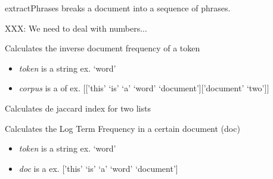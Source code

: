 \documentclass[letterpaper,10pt,english]{sphinxmanual}
\begin{document}

\begin{fulllineitems}
\label{theseus:theseus.extractPhrases}
extractPhrases breaks a document into a sequence of phrases.

XXX: We need to deal with numbers...

\end{fulllineitems}


\begin{fulllineitems}
\label{theseus:theseus.idf}
Calculates the inverse document frequency of a token
\begin{itemize}
\item {} 
\emph{token} is a string               ex. `word'

\item {} 
\emph{corpus} is a  of     ex. {[}{[}'this' `is' `a' `word' `document'{]}{[}'document' `two'{]}{]}

\end{itemize}

\end{fulllineitems}


\begin{fulllineitems}
\label{theseus:theseus.jaccard}
Calculates de jaccard index for two lists

\end{fulllineitems}


\begin{fulllineitems}
\label{theseus:theseus.logtf}
Calculates the Log Term Frequency in a certain document (doc)
\begin{itemize}
\item {} 
\emph{token} is a string   ex. `word'

\item {} 
\emph{doc} is a      ex. {[}'this' `is' `a' `word' `document'{]}

\end{itemize}

\end{fulllineitems}
\end{document}
